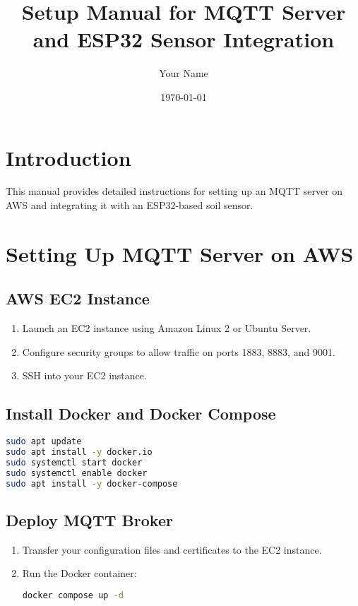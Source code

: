 \documentclass{article}
\title{Setup Manual for MQTT Server and ESP32 Sensor Integration}
\author{Your Name}
\date{\today}
\begin{document}
\maketitle

\tableofcontents

\section{Introduction}
This manual provides detailed instructions for setting up an MQTT server on AWS and integrating it with an ESP32-based soil sensor.

\section{Setting Up MQTT Server on AWS}
\subsection{AWS EC2 Instance}
\begin{enumerate}
    \item Launch an EC2 instance using Amazon Linux 2 or Ubuntu Server.
    \item Configure security groups to allow traffic on ports 1883, 8883, and 9001.
    \item SSH into your EC2 instance.
\end{enumerate}

\subsection{Install Docker and Docker Compose}
\begin{lstlisting}[language=bash]
sudo apt update
sudo apt install -y docker.io
sudo systemctl start docker
sudo systemctl enable docker
sudo apt install -y docker-compose
\end{lstlisting}

\subsection{Deploy MQTT Broker}
\begin{enumerate}
    \item Transfer your configuration files and certificates to the EC2 instance.
    \item Run the Docker container:
    \begin{lstlisting}[language=bash]
    docker compose up -d
    \end{lstlisting}
\end{enumerate}
\end{document}
